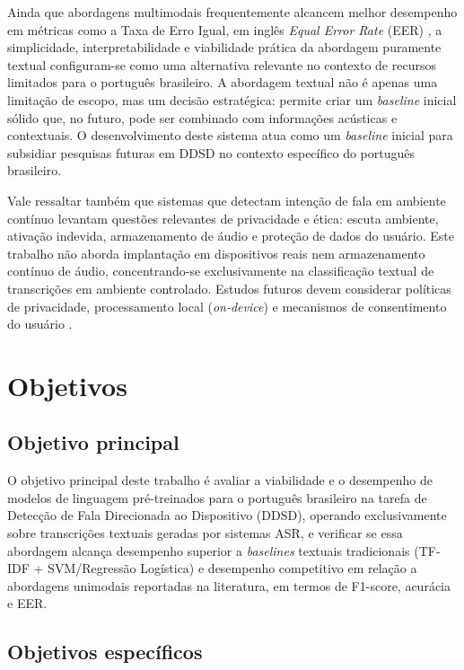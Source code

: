 \documentclass[
    12pt,                %
    openright,           %
    oneside,             %
    a4paper,             %
    english,             %
    brazil               %
]{abntex2}
\begin{document}
Ainda que abordagens multimodais frequentemente alcancem melhor desempenho em métricas como a Taxa de Erro Igual, em inglês \textit{Equal Error Rate} (EER) \cite{Wagner2024}, a simplicidade, interpretabilidade e viabilidade prática da abordagem puramente textual configuram-se como uma alternativa relevante no contexto de recursos limitados para o português brasileiro. A abordagem textual não é apenas uma limitação de escopo, mas um decisão estratégica: permite criar um \textit{baseline} inicial sólido que, no futuro, pode ser combinado com informações acústicas e contextuais. O desenvolvimento deste sistema atua como um \textit{baseline} inicial para subsidiar pesquisas futuras em DDSD no contexto específico do português brasileiro.

Vale ressaltar também que sistemas que detectam intenção de fala em ambiente contínuo levantam questões relevantes de privacidade e ética: escuta ambiente, ativação indevida, armazenamento de áudio e proteção de dados do usuário. Este trabalho não aborda implantação em dispositivos reais nem armazenamento contínuo de áudio, concentrando-se exclusivamente na classificação textual de transcrições em ambiente controlado. Estudos futuros devem considerar políticas de privacidade, processamento local (\textit{on-device}) e mecanismos de consentimento do usuário \cite{Chen2021}.

\section{Objetivos}
\label{sec:objetivos}


\subsection{Objetivo principal}

O objetivo principal deste trabalho é avaliar a viabilidade e o desempenho de modelos de linguagem pré-treinados para o português brasileiro na tarefa de Detecção de Fala Direcionada ao Dispositivo (DDSD), operando exclusivamente sobre transcrições textuais geradas por sistemas ASR, e verificar se essa abordagem alcança desempenho superior a \textit{baselines} textuais tradicionais (TF-IDF + SVM/Regressão Logística) e desempenho competitivo em relação a abordagens unimodais reportadas na literatura, em termos de F1-score, acurácia e EER.

\subsection{Objetivos específicos}
\end{document}
